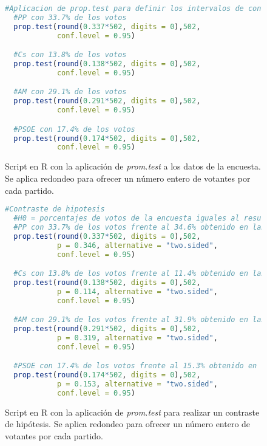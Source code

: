 \documentclass[11pt,a4paper]{article}
\begin{document}
\begin{figure}
\centering
\begin{lstlisting}[language=R]
  #Aplicacion de prop.test para definir los intervalos de confianza con n = 502 y nivel de confianza del 95%
  #PP con 33.7% de los votos
  prop.test(round(0.337*502, digits = 0),502,
            conf.level = 0.95)

  #Cs con 13.8% de los votos
  prop.test(round(0.138*502, digits = 0),502,
            conf.level = 0.95)

  #AM con 29.1% de los votos
  prop.test(round(0.291*502, digits = 0),502,
            conf.level = 0.95)

  #PSOE con 17.4% de los votos
  prop.test(round(0.174*502, digits = 0),502,
            conf.level = 0.95)
\end{lstlisting}
\caption{Script en R con la aplicación de \textit{prom.test} a los datos de la encuesta. Se aplica redondeo para ofrecer un número entero de votantes por cada partido.}
\label{fig:proptest}
\end{figure}

\begin{figure}
\centering
\begin{lstlisting}[language=R]
  #Contraste de hipotesis
  #H0 = porcentajes de votos de la encuesta iguales al resultado electoral
  #PP con 33.7% de los votos frente al 34.6% obtenido en las elecciones
  prop.test(round(0.337*502, digits = 0),502,
            p = 0.346, alternative = "two.sided",
            conf.level = 0.95)

  #Cs con 13.8% de los votos frente al 11.4% obtenido en las elecciones
  prop.test(round(0.138*502, digits = 0),502,
            p = 0.114, alternative = "two.sided",
            conf.level = 0.95)

  #AM con 29.1% de los votos frente al 31.9% obtenido en las elecciones
  prop.test(round(0.291*502, digits = 0),502,
            p = 0.319, alternative = "two.sided",
            conf.level = 0.95)

  #PSOE con 17.4% de los votos frente al 15.3% obtenido en las elecciones
  prop.test(round(0.174*502, digits = 0),502,
            p = 0.153, alternative = "two.sided",
            conf.level = 0.95)
\end{lstlisting}
\caption{Script en R con la aplicación de \textit{prom.test} para realizar un contraste de hipótesis. Se aplica redondeo para ofrecer un número entero de votantes por cada partido.}
\label{fig:contraste}
\end{figure}
\end{document}
